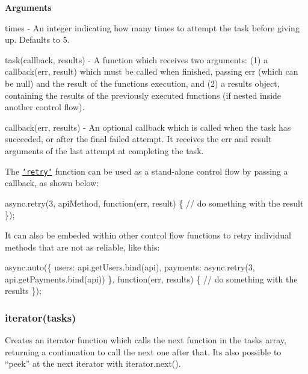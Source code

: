 {\bfseries Arguments}


\begin{DoxyItemize}
\item {\ttfamily times} -\/ An integer indicating how many times to attempt the {\ttfamily task} before giving up. Defaults to 5.
\item {\ttfamily task(callback, results)} -\/ A function which receives two arguments\+: (1) a {\ttfamily callback(err, result)} which must be called when finished, passing {\ttfamily err} (which can be {\ttfamily null}) and the {\ttfamily result} of the function\textquotesingle{}s execution, and (2) a {\ttfamily results} object, containing the results of the previously executed functions (if nested inside another control flow).
\item {\ttfamily callback(err, results)} -\/ An optional callback which is called when the task has succeeded, or after the final failed attempt. It receives the {\ttfamily err} and {\ttfamily result} arguments of the last attempt at completing the {\ttfamily task}.
\end{DoxyItemize}

The \href{#retry}{\tt `retry`} function can be used as a stand-\/alone control flow by passing a callback, as shown below\+:


\begin{DoxyCode}
async.retry(3, apiMethod, \textcolor{keyword}{function}(err, result) \{
    \textcolor{comment}{// do something with the result}
\});
\end{DoxyCode}


It can also be embeded within other control flow functions to retry individual methods that are not as reliable, like this\+:


\begin{DoxyCode}
async.auto(\{
    users: api.getUsers.bind(api),
    payments: async.retry(3, api.getPayments.bind(api))
\}, \textcolor{keyword}{function}(err, results) \{
  \textcolor{comment}{// do something with the results}
\});
\end{DoxyCode}






\label{_iterator}%
 \subsubsection*{iterator(tasks)}

Creates an iterator function which calls the next function in the {\ttfamily tasks} array, returning a continuation to call the next one after that. It\textquotesingle{}s also possible to “peek” at the next iterator with {\ttfamily iterator.\+next()}.

